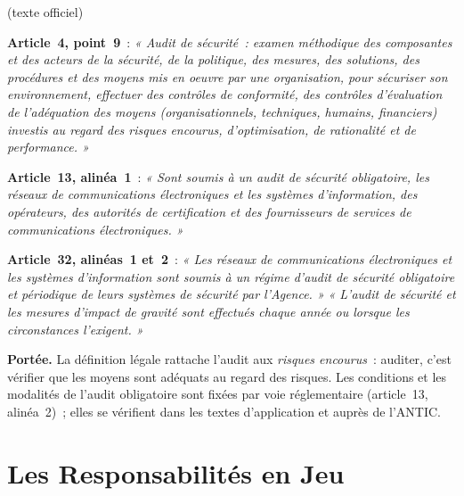 \begin{boxjuris}
\textbf{} (texte officiel)

\medskip
\textbf{Article~4, point~9}~: \textit{« Audit de sécurité~: examen
méthodique des composantes et des acteurs de la sécurité, de la politique,
des mesures, des solutions, des procédures et des moyens mis en oeuvre
par une organisation, pour sécuriser son environnement, effectuer des
contrôles de conformité, des contrôles d'évaluation de l'adéquation des
moyens (organisationnels, techniques, humains, financiers) investis au
regard des risques encourus, d'optimisation, de rationalité et de
performance. »}

\medskip
\textbf{Article~13, alinéa~1}~: \textit{« Sont soumis à un audit de
sécurité obligatoire, les réseaux de communications électroniques et les
systèmes d'information, des opérateurs, des autorités de certification et
des fournisseurs de services de communications électroniques. »}

\medskip
\textbf{Article~32, alinéas~1 et~2}~: \textit{« Les réseaux de
communications électroniques et les systèmes d'information sont soumis à
un régime d'audit de sécurité obligatoire et périodique de leurs systèmes
de sécurité par l'Agence. »} \textit{« L'audit de sécurité et les mesures
d'impact de gravité sont effectués chaque année ou lorsque les
circonstances l'exigent. »}

\medskip
\textbf{Portée.} La définition légale rattache l'audit aux \emph{risques
encourus}~: auditer, c'est vérifier que les moyens sont adéquats au
regard des risques. Les conditions et les modalités de l'audit obligatoire
sont fixées par voie réglementaire (article~13, alinéa~2)~; elles se
vérifient dans les textes d'application et auprès de l'ANTIC.
\end{boxjuris}

\section{Les Responsabilités en Jeu}
\label{sec:c05-responsabilites}

